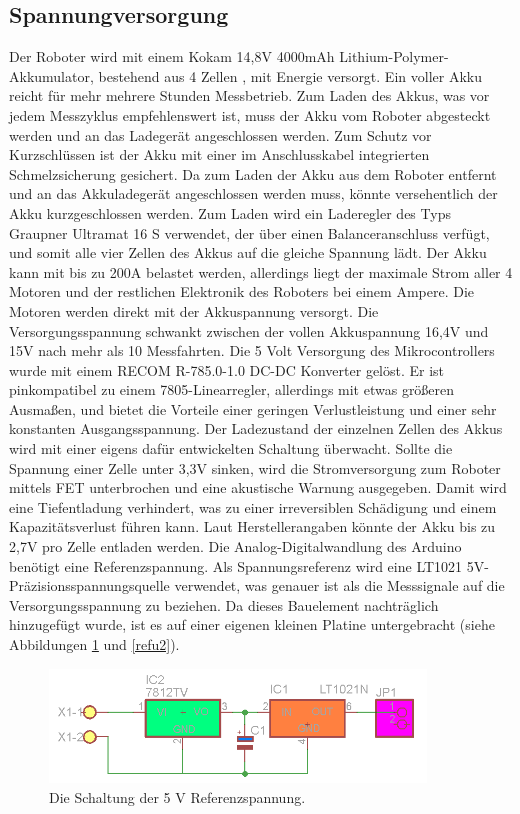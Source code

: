 \documentclass[a4paper,bibtotoc,oneside]{scrbook}
\begin{document}
\subsection{Spannungversorgung}\thispagestyle{empty}
Der Roboter wird mit einem Kokam 14,8V 4000mAh Lithium-Polymer-Akkumulator, bestehend aus 4 Zellen \cite{kokam}, mit Energie versorgt. Ein voller Akku reicht für mehr mehrere Stunden Messbetrieb. Zum Laden des Akkus, was vor jedem Messzyklus empfehlenswert ist, muss der Akku vom Roboter abgesteckt werden und an das Ladegerät angeschlossen werden. Zum Schutz vor Kurzschlüssen ist der Akku mit einer im Anschlusskabel integrierten Schmelzsicherung gesichert. Da zum Laden der Akku aus dem Roboter entfernt und an das Akkuladegerät angeschlossen werden muss, könnte versehentlich der Akku kurzgeschlossen werden. Zum Laden wird ein Laderegler des Typs Graupner Ultramat 16 S verwendet, der über einen Balanceranschluss verfügt, und somit alle vier Zellen des Akkus auf die gleiche Spannung lädt. 
Der Akku kann mit bis zu 200A belastet werden, allerdings liegt der maximale Strom aller 4 Motoren und der restlichen Elektronik des Roboters bei einem Ampere. Die Motoren werden direkt mit der Akkuspannung versorgt. Die Versorgungsspannung schwankt zwischen der vollen Akkuspannung 16,4V und 15V nach mehr als 10 Messfahrten.
Die 5 Volt Versorgung des Mikrocontrollers wurde mit einem RECOM R-785.0-1.0 DC-DC Konverter \cite{ref5} gelöst. Er ist pinkompatibel zu einem 7805-Linearregler, allerdings mit etwas größeren Ausmaßen, und bietet die Vorteile einer geringen Verlustleistung und einer sehr konstanten Ausgangsspannung. 
Der Ladezustand der einzelnen Zellen des Akkus wird mit einer eigens dafür entwickelten Schaltung überwacht. Sollte die Spannung einer Zelle unter 3,3V sinken, wird die Stromversorgung zum Roboter mittels FET unterbrochen und eine akustische Warnung ausgegeben. Damit wird eine Tiefentladung verhindert, was zu einer irreversiblen Schädigung und einem Kapazitätsverlust führen kann. Laut Herstellerangaben könnte der Akku bis zu 2,7V pro Zelle entladen werden.
Die Analog-Digitalwandlung des Arduino benötigt eine Referenzspannung. Als Spannungsreferenz wird eine LT1021 5V-Präzisionsspannungsquelle \cite{lt1021} verwendet, was genauer ist als die Messsignale auf die Versorgungsspannung zu beziehen. Da dieses Bauelement nachträglich hinzugefügt wurde, ist es auf einer eigenen kleinen Platine untergebracht (siehe Abbildungen \ref{refu} und \ref{refu2}).

\begin{figure}[htbp]
\centering
\includegraphics[width=100mm]{img/refu.png}
\caption{Die Schaltung der 5 V Referenzspannung.}\label{refu}
\end{figure}
\end{document}

